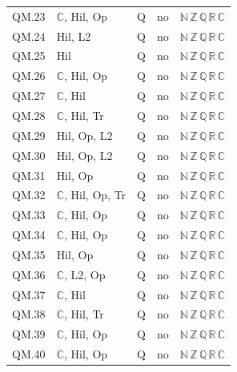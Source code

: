 {\begin{longtable}{l p{6.8cm} c c l}
QM.23 & $\mathbb C$, \textsf{Hil}, \textsf{Op} & Q & no & $\mathbb N\,\mathbb Z\,\mathbb Q\,\mathbb R\,\mathbb C$ \\
QM.24 & \textsf{Hil}, \textsf{L2} & Q & no & $\mathbb N\,\mathbb Z\,\mathbb Q\,\mathbb R\,\mathbb C$ \\
QM.25 & \textsf{Hil} & Q & no & $\mathbb N\,\mathbb Z\,\mathbb Q\,\mathbb R\,\mathbb C$ \\
QM.26 & $\mathbb C$, \textsf{Hil}, \textsf{Op} & Q & no & $\mathbb N\,\mathbb Z\,\mathbb Q\,\mathbb R\,\mathbb C$ \\
QM.27 & $\mathbb C$, \textsf{Hil} & Q & no & $\mathbb N\,\mathbb Z\,\mathbb Q\,\mathbb R\,\mathbb C$ \\
QM.28 & $\mathbb C$, \textsf{Hil}, \textsf{Tr} & Q & no & $\mathbb N\,\mathbb Z\,\mathbb Q\,\mathbb R\,\mathbb C$ \\
QM.29 & \textsf{Hil}, \textsf{Op}, \textsf{L2} & Q & no & $\mathbb N\,\mathbb Z\,\mathbb Q\,\mathbb R\,\mathbb C$ \\
QM.30 & \textsf{Hil}, \textsf{Op}, \textsf{L2} & Q & no & $\mathbb N\,\mathbb Z\,\mathbb Q\,\mathbb R\,\mathbb C$ \\
QM.31 & \textsf{Hil}, \textsf{Op} & Q & no & $\mathbb N\,\mathbb Z\,\mathbb Q\,\mathbb R\,\mathbb C$ \\
QM.32 & $\mathbb C$, \textsf{Hil}, \textsf{Op}, \textsf{Tr} & Q & no & $\mathbb N\,\mathbb Z\,\mathbb Q\,\mathbb R\,\mathbb C$ \\
QM.33 & $\mathbb C$, \textsf{Hil}, \textsf{Op} & Q & no & $\mathbb N\,\mathbb Z\,\mathbb Q\,\mathbb R\,\mathbb C$ \\
QM.34 & $\mathbb C$, \textsf{Hil}, \textsf{Op} & Q & no & $\mathbb N\,\mathbb Z\,\mathbb Q\,\mathbb R\,\mathbb C$ \\
QM.35 & \textsf{Hil}, \textsf{Op} & Q & no & $\mathbb N\,\mathbb Z\,\mathbb Q\,\mathbb R\,\mathbb C$ \\
QM.36 & $\mathbb C$, \textsf{L2}, \textsf{Op} & Q & no & $\mathbb N\,\mathbb Z\,\mathbb Q\,\mathbb R\,\mathbb C$ \\
QM.37 & $\mathbb C$, \textsf{Hil} & Q & no & $\mathbb N\,\mathbb Z\,\mathbb Q\,\mathbb R\,\mathbb C$ \\
QM.38 & $\mathbb C$, \textsf{Hil}, \textsf{Tr} & Q & no & $\mathbb N\,\mathbb Z\,\mathbb Q\,\mathbb R\,\mathbb C$ \\
QM.39 & $\mathbb C$, \textsf{Hil}, \textsf{Op} & Q & no & $\mathbb N\,\mathbb Z\,\mathbb Q\,\mathbb R\,\mathbb C$ \\
QM.40 & $\mathbb C$, \textsf{Hil}, \textsf{Op} & Q & no & $\mathbb N\,\mathbb Z\,\mathbb Q\,\mathbb R\,\mathbb C$ \\

\end{longtable}}
